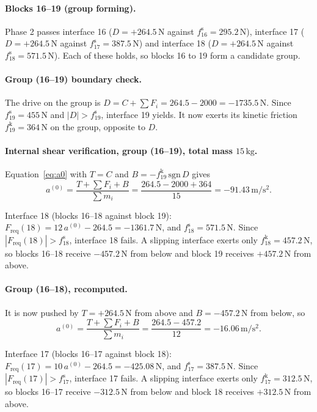 \documentclass[11pt,a4paper]{article}
\begin{document}
\paragraph{Blocks 16--19 (group forming).} Phase 2 passes interface 16 ($D=+264.5\,\mathrm{N}$ against $f^{\mathrm s}_{16}=295.2\,\mathrm{N}$), interface 17 ($D=+264.5\,\mathrm{N}$ against $f^{\mathrm s}_{17}=387.5\,\mathrm{N}$) and interface 18 ($D=+264.5\,\mathrm{N}$ against $f^{\mathrm s}_{18}=571.5\,\mathrm{N}$). Each of these holds, so blocks 16 to 19 form a candidate group.

\paragraph{Group (16--19) boundary check.} The drive on the group is $D=C+\sum F_i=264.5 - 2000=-1735.5\,\mathrm{N}$. Since $f^{\mathrm s}_{19}=455\,\mathrm{N}$ and $|D|>f^{\mathrm s}_{19}$, interface 19 yields. It now exerts its kinetic friction $f^{\mathrm k}_{19}=364\,\mathrm{N}$ on the group, opposite to $D$.

\paragraph{Internal shear verification, group (16--19), total mass $15\,\mathrm{kg}$.} Equation~\eqref{eq:a0} with $T=C$ and $B=-f^{\mathrm k}_{19}\,\mathrm{sgn}\,D$ gives\[a^{(0)}=\dfrac{T+\sum F_i+B}{\sum m_i}=\dfrac{264.5 - 2000 + 364}{15}=-91.43\,\mathrm{m/s^2}.\]

Interface 18 (blocks 16--18 against block 19): $F_{\mathrm{req}}(18)=12\,a^{(0)} - 264.5=-1361.7\,\mathrm{N}$, and $f^{\mathrm s}_{18}=571.5\,\mathrm{N}$. Since $|F_{\mathrm{req}}(18)|>f^{\mathrm s}_{18}$, interface 18 fails. A slipping interface exerts only $f^{\mathrm k}_{18}=457.2\,\mathrm{N}$, so blocks 16--18 receive $-457.2\,\mathrm{N}$ from below and block 19 receives $+457.2\,\mathrm{N}$ from above.

\paragraph{Group (16--18), recomputed.} It is now pushed by $T=+264.5\,\mathrm{N}$ from above and $B=-457.2\,\mathrm{N}$ from below, so\[a^{(0)}=\dfrac{T+\sum F_i+B}{\sum m_i}=\dfrac{264.5 - 457.2}{12}=-16.06\,\mathrm{m/s^2}.\]

Interface 17 (blocks 16--17 against block 18): $F_{\mathrm{req}}(17)=10\,a^{(0)} - 264.5=-425.08\,\mathrm{N}$, and $f^{\mathrm s}_{17}=387.5\,\mathrm{N}$. Since $|F_{\mathrm{req}}(17)|>f^{\mathrm s}_{17}$, interface 17 fails. A slipping interface exerts only $f^{\mathrm k}_{17}=312.5\,\mathrm{N}$, so blocks 16--17 receive $-312.5\,\mathrm{N}$ from below and block 18 receives $+312.5\,\mathrm{N}$ from above.
\end{document}
